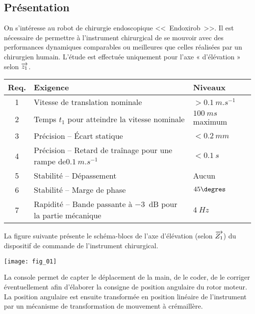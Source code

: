 \begin{multicols}{2}
\setcounter{exo}{0}
\section*{Présentation}
On s’intéresse au robot de chirurgie endoscopique <<~Endoxirob~>>. Il est nécessaire de permettre à l’instrument chirurgical de se mouvoir avec des performances dynamiques comparables ou meilleures que celles réalisées par un chirurgien humain. 
L’étude est effectuée uniquement pour l’axe « d’élévation » selon $\overrightarrow{z_1}$. 


\begin{center}
\begin{tabular}{|c|p{4.4cm}|p{1.7cm}|}
\hline 
Req. & Exigence & Niveaux \\ \hline
1 & Vitesse de translation nominale & $>\SI{0,1}{m.s^{-1}}$ \\ \hline
2 & Temps $t_1$ pour atteindre la vitesse nominale & $\SI{100}{ms}$ maximum \\ \hline
3 & Précision -- Écart statique & $<\SI{0,2}{mm}$ \\ \hline
4 & Précision --  Retard de traînage pour une rampe de$ \SI{0,1}{m.s^{-1}}$  & $<\SI{0,1}{s}$ \\ \hline
5 & Stabilité -- Dépassement & Aucun \\ \hline
6 & Stabilité -- Marge de phase & $45\degres$ \\ \hline
7 & Rapidité -- Bande passante à \SI{-3}{dB} pour la partie mécanique & $\SI{4}{Hz}$ \\
\hline
\end{tabular}
\end{center}
La figure suivante présente le schéma-blocs de l'axe d’élévation (selon $\overrightarrow{Z_1}$) du dispositif de commande de l’instrument chirurgical. 

\begin{center}
\texttt{[image: fig\_01]}
\end{center}

La console permet de capter le déplacement de la main, de le coder, de le corriger éventuellement afin d’élaborer la consigne de position angulaire du rotor moteur. 
La position angulaire est ensuite transformée en position linéaire de l’instrument par un mécanisme de transformation de mouvement à crémaillère.


\end{multicols}
